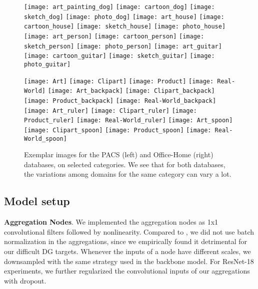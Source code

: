     \begin{figure}
\centering
\begin{minipage}{.5\textwidth}
  \centering
  \texttt{[image: art\_painting\_dog]}
\texttt{[image: cartoon\_dog]}
\texttt{[image: sketch\_dog]}
\texttt{[image: photo\_dog]}
\texttt{[image: art\_house]}
\texttt{[image: cartoon\_house]}
\texttt{[image: sketch\_house]}
\texttt{[image: photo\_house]}
\texttt{[image: art\_person]}
\texttt{[image: cartoon\_person]}
\texttt{[image: sketch\_person]}
\texttt{[image: photo\_person]}
\texttt{[image: art\_guitar]}
\texttt{[image: cartoon\_guitar]}
\texttt{[image: sketch\_guitar]}
\texttt{[image: photo\_guitar]}
\end{minipage}\begin{minipage}{.5\textwidth}
  \centering
  \texttt{[image: Art]}
\texttt{[image: Clipart]}
\texttt{[image: Product]}
\texttt{[image: Real-World]}
\texttt{[image: Art\_backpack]}
\texttt{[image: Clipart\_backpack]}
\texttt{[image: Product\_backpack]}
\texttt{[image: Real-World\_backpack]}
\texttt{[image: Art\_ruler]}
\texttt{[image: Clipart\_ruler]}
\texttt{[image: Product\_ruler]}
\texttt{[image: Real-World\_ruler]}
\texttt{[image: Art\_spoon]}
\texttt{[image: Clipart\_spoon]}
\texttt{[image: Product\_spoon]}
\texttt{[image: Real-World\_spoon]}
\end{minipage}
\caption{Exemplar images for the PACS (left) and Office-Home (right) databases, on selected categories. We see that for both databases, the variations among domains for the same category can vary a lot.}
\end{figure}
    
    \subsection{Model setup}
	\label{sec:model}

	\textbf{Aggregation Nodes}. We implemented the aggregation nodes as 1x1 convolutional filters followed by nonlinearity. Compared to \cite{yu2017deep}, we did not use batch normalization in the aggregations, since we empirically found it detrimental for our difficult DG targets. Whenever the inputs of a node have different scales, we downsampled with the same strategy used in the backbone model. For ResNet-18 experiments, we further regularized the convolutional inputs of our aggregations with dropout.
    
